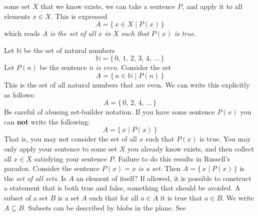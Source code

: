 \documentclass{article}
\theoremstyle{plain}
\theoremstyle{normal}
\newenvironment{example}{%
    \pushQED{\qed}\renewcommand{\qedsymbol}{$\blacksquare$}\examplex%
}{%
    \popQED\endexamplex%
}
\newenvironment{definition}{%
    \pushQED{\qed}\renewcommand{\qedsymbol}{$\blacksquare$}\definitionx%
}{%
    \popQED\enddefinitionx%
}
\begin{document}
        some set $X$ that we know exists, we can take a sentence $P$, and
        apply it to all elements $x\in{X}$.
        This is expressed
        \begin{equation}
            A=\{\,x\in{X}\;|\;P(x)\,\}
        \end{equation}
        which reads $A$ \textit{is the set of all} $x$ \textit{in} $X$
        \textit{such that} $P(x)$ \textit{is true}.
        \begin{example}
            Let $\mathbb{N}$ be the set of natural numbers
            \begin{equation}
                \mathbb{N}=\{\,0,\,1,\,2,\,3,\,4,\,\dots\,\}
            \end{equation}
            Let $P(n)$ be the sentence $n$ \textit{is even}. Consider the
            set
            \begin{equation}
                A=\{\,n\in\mathbb{N}\;|\;P(n)\,\}
            \end{equation}
            This is the set of all natural numbers that are even. We can write
            this explicitly as follows:
            \begin{equation}
                A=\{\,0,\,2,\,4,\,\dots\,\}
            \end{equation}
        \end{example}
        Be careful of abusing set-builder notation. If you have some sentence
        $P(x)$ you can \textbf{not} write the following:
        \begin{equation}
            A=\{\,x\;|\;P(x)\,\}
        \end{equation}
        That is, you may not consider the set of all $x$ such that $P(x)$ is
        true. You may only apply your sentence to some set $X$ you already
        know exists, and then collect all $x\in{X}$ satisfying your sentence
        $P$. Failure to do this results in Russell's paradox. Consider the
        sentence $P(x)=x$ \textit{is a set}. Then
        $A=\{\,x\;|\;P(x)\,\}$ is the \textit{set of all sets}. Is
        $A$ an element of itself? If allowed, it is possible to construct
        a statement that is both true and false, something that should be
        avoided.
        \begin{definition}[\textbf{Subset}]
            A subset of a set $B$ is a set $A$ such that for all $a\in{A}$
            it is true that $a\in{B}$. We write $A\subseteq{B}$.
        \end{definition}
        Subsets can be described by blobs in the plane. See
\end{document}
